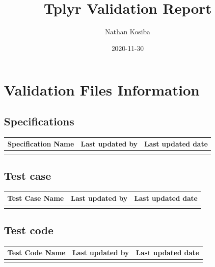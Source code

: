 \documentclass[
]{article}
\title{Tplyr Validation Report}
\author{Nathan Kosiba}
\date{2020-11-30}
\begin{document}
\maketitle

\newpage
\tableofcontents
\newpage

\hypertarget{validation-files-information}{%
\section{Validation Files
Information}\label{validation-files-information}}

\hypertarget{specifications}{%
\subsection{Specifications}\label{specifications}}

\begin{table}[H]
\centering
\begin{tabular}{lll}
\toprule
Specification Name & Last updated by & Last updated date\\
\midrule
\cellcolor{gray!6}{specification.Rmd} & \cellcolor{gray!6}{Nathan Kosiba} & \cellcolor{gray!6}{2020-11-05}\\
\bottomrule
\end{tabular}
\end{table}

\hypertarget{test-case}{%
\subsection{Test case}\label{test-case}}

\begin{table}[H]
\centering
\begin{tabular}{lll}
\toprule
Test Case Name & Last updated by & Last updated date\\
\midrule
\cellcolor{gray!6}{test\_cases.Rmd} & \cellcolor{gray!6}{Nathan Kosiba} & \cellcolor{gray!6}{2020-11-05}\\
\bottomrule
\end{tabular}
\end{table}

\hypertarget{test-code}{%
\subsection{Test code}\label{test-code}}

\begin{table}[H]
\centering
\begin{tabular}{lll}
\toprule
Test Code Name & Last updated by & Last updated date\\
\midrule
\cellcolor{gray!6}{test\_cases.R} & \cellcolor{gray!6}{Nathan Kosiba} & \cellcolor{gray!6}{2020-11-30}\\
\bottomrule
\end{tabular}
\end{table}
\end{document}
